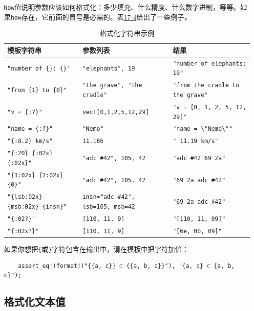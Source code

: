 \texttt{how}值说明参数应该如何格式化：多少填充、什么精度、什么数字进制，等等。如果\texttt{how}存在，它前面的冒号是必需的。表\hyperref[t17-4]{17-4}给出了一些例子。

\begin{longtable}{p{}p{}p{}}
    \caption{格式化字符串示例}
    \label{t17-4}\\
    \hline
    \textbf{模板字符串} & \textbf{参数列表} & \textbf{结果} \\
    \hline
    \texttt{"number of \{\}: \{\}"} & \texttt{"elephants", 19} & \texttt{"number of elephants: 19"} \\
    \hline
    \rowcolor{tablecolor}
    \texttt{"from \{1\} to \{0\}"} & \texttt{"the grave", "the cradle"} & \texttt{"from the cradle to the grave"} \\
    \hline
    \texttt{"v = \{:?\}"} & \texttt{vec![0,1,2,5,12,29]} & \texttt{"v = [0, 1, 2, 5, 12, 29]"} \\
    \hline
    \rowcolor{tablecolor}
    \texttt{"name = \{:?\}"} & \texttt{"Nemo"} & \texttt{"name = \textbackslash "Nemo\textbackslash""} \\
    \hline
    \texttt{"\{:8.2\} km/s"} & \texttt{11.186} & \texttt{"\ 11.19 km/s"} \\
    \hline
    \rowcolor{tablecolor}
    \texttt{"\{:20\} \{:02x\} \{:02x\}"} & \texttt{"adc \#42", 105, 42} & \texttt{"adc \#42 69 2a"} \\
    \hline
    \texttt{"\{1:02x\} \{2:02x\} \{0\}"} & \texttt{"adc \#42", 105, 42} & \texttt{"69 2a adc \#42"} \\
    \hline
    \rowcolor{tablecolor}
    \texttt{"\{lsb:02x\} \{msb:02x\} \{insn\}"} & \texttt{insn="adc \#42", lsb=105, msb=42} & \texttt{"69 2a adc \#42"} \\
    \hline
    \texttt{"\{:02?\}"} & \texttt{[110, 11, 9]} & \texttt{"[110, 11, 09]"} \\
    \hline
    \rowcolor{tablecolor}
    \texttt{"\{:02x?\}"} & \texttt{[110, 11, 9]} & \texttt{"[6e, 0b, 09]"} \\
    \hline
\end{longtable}

如果你想把\texttt{\{}或\texttt{\}}字符包含在输出中，请在模板中把字符加倍：
\begin{verbatim}
    assert_eq!(format!("{{a, c}} ⊂ {{a, b, c}}"), "{a, c} ⊂ {a, b, c}");
\end{verbatim}

\subsection{格式化文本值}

